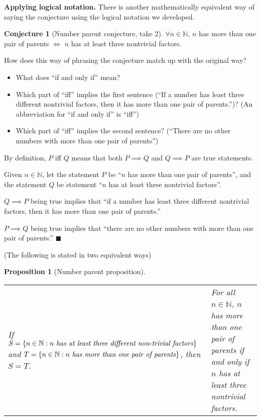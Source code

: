 \documentclass[11pt]{article}
\newenvironment{task}
	{\begin{mdframed}[linecolor=lightgray, linewidth=3pt]\raggedright}
	{\end{mdframed}}
\newcommand\tn{\textnormal}
\newcommand{\N}{\mathbb{N}}
\newcommand\st{:}
\newtheorem{proposition}[theorem]{Proposition}
\theoremstyle{definition}
\newtheorem{conjecture}[theorem]{Conjecture}
\newenvironment{solution}{{\it Solution.} }{\hfill {\color{lightgray}$\blacksquare$}}
\begin{document}
\bigskip
{\bf Applying logical notation.} There is another mathematically equivalent way of saying the conjecture using the logical notation we developed. 

\begin{conjecture}[Number parent conjecture, take 2]\label{c: number parent 2}
$\forall n\in \N$, $n$ has more than one pair of parents $\iff$ $n$ has at least three nontrivial factors.
\end{conjecture}

\begin{task}
How does this way of phrasing the conjecture match up with the original way? 
	\begin{itemize}
	\item What does ``if and only if'' mean? 
	\item Which part of ``iff'' implies the first sentence (``If a number has least three different nontrivial factors, then it has more than one pair of parents.'')?   (An abbreviation for ``if and only if'' is ``iff'')
	\item Which part of ``iff'' implies the second sentence? (``There are no other numbers with more than one pair of parents'') 
	\end{itemize}
\end{task}


\begin{solution}
By definition, $P$ iff $Q$ means that both $P\implies Q$ and $Q\implies P$ are true statements.

Given $n\in \N$, let the statement $P$ be ``$n$ has more than one pair of parents'', and the statement $Q$ be statement ``$n$ has at least three nontrivial factors''.

$Q\implies P$ being true implies that ``if a number has least three different nontrivial factors, then it has more than one pair of parents.'' 

$P\implies Q$ being true implies that ``there are no other numbers with more than one pair of parents.'' 
\end{solution}

\bigskip


(The following is stated in two equivalent ways) 
\begin{proposition}[Number parent proposition]\label{p: number parent}
\hspace*{-6pt}\begin{tabular}{L{3.5in}|L{2.8in}}
If $S=\{ n\in \N\st n\tn{ \it has at least three different non-trivial factors}\}$ and $T=\{ n\in \N \st n \tn{ \it has more than one pair of parents}\}$, then $S=T$.
& 
For all $n\in \N$, $n$ has more than one pair of parents if and only if $n$ has at least three nontrivial factors.
\end{tabular}
\end{proposition}
\end{document}
